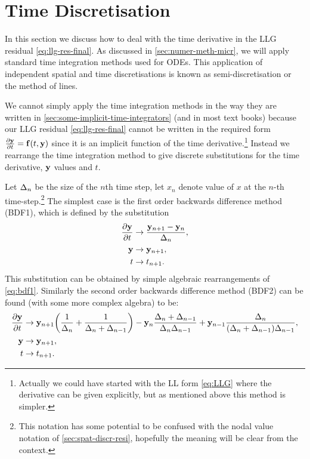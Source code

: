 \section{Time Discretisation}
\label{sec:time-discretisation-resi}

In this section we discuss how to deal with the time derivative in the LLG residual \eqref{eq:llg-res-final}.
As discussed in \autoref{sec:numer-meth-micr}, we will apply standard time integration methods used for ODEs.
This application of independent spatial and time discretisations is known as semi-discretisation or the method of lines.

We cannot simply apply the time integration methods in the way they are written in \autoref{sec:some-implicit-time-integrators} (and in most text books) because our LLG residual \eqref{eq:llg-res-final} cannot be written in the required form $\frac{\partial \mathbf{y}}{\partial t} = {\mathbf{f}}(t, \mathbf{y})$ since it is an implicit function of the time derivative.\footnote{Actually we could have started with the LL form \eqref{eq:LLG} where the derivative can be given explicitly, but as mentioned above this method is simpler.}
Instead we rearrange the time integration method to give discrete substitutions for the time derivative, $\mathbf{y}$ values and $t$.

Let $\Delta_{n}$ be the size of the $n$th time step, let $x_n$ denote value of $x$ at the $n$-th time-step.\footnote{This notation has some potential to be confused with the nodal value notation of \autoref{sec:spat-discr-resi}, hopefully the meaning will be clear from the context.}
The simplest case is the first order backwards difference method (BDF1), which is defined by the substitution
\begin{equation}
  \begin{aligned}
    \frac{\partial \mathbf{y}}{\partial t} &\rightarrow \frac{\mathbf{y}_{n+1} - \mathbf{y}_n}{\Delta_{n}}, \\
    \mathbf{y} &\rightarrow \mathbf{y}_{n+1}, \\
    t &\rightarrow t_{n+1}.
    \label{eq:impl-bdf1}
  \end{aligned}
\end{equation}
This substitution can be obtained by simple algebraic rearrangements of \eqref{eq:bdf1}.
Similarly the second order backwards difference method (BDF2) can be found (with some more complex algebra) to be:
\begin{equation}
  \begin{aligned}
    \frac{\partial \mathbf{y}}{\partial t} &\rightarrow \mathbf{y}_{n+1}{\left( \frac{1}{\Delta_{n}} + \frac{1}{\Delta_{n} + \Delta_{n-1}} \right)}
    - \mathbf{y}_n \frac{\Delta_{n} + \Delta_{n-1}}{\Delta_{n}\Delta_{n-1}}
    + \mathbf{y}_{n-1} \frac{\Delta_{n}}{(\Delta_{n} + \Delta_{n-1})\Delta_{n-1}}, \\
    \mathbf{y} &\rightarrow \mathbf{y}_{n+1}, \\
    t &\rightarrow t_{n+1}.
    \label{eq:impl-bdf2}
  \end{aligned}
\end{equation}

